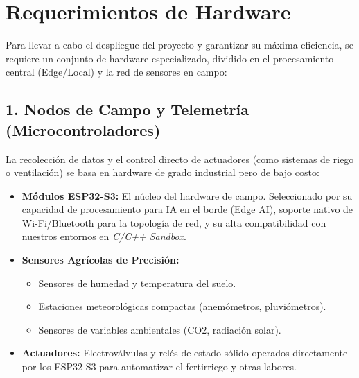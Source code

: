 \documentclass[12pt,a4paper]{article}
\begin{document}
\section{Requerimientos de Hardware}
Para llevar a cabo el despliegue del proyecto y garantizar su máxima eficiencia, se requiere un conjunto de hardware especializado, dividido en el procesamiento central (Edge/Local) y la red de sensores en campo:

\subsection{1. Nodos de Campo y Telemetría (Microcontroladores)}
La recolección de datos y el control directo de actuadores (como sistemas de riego o ventilación) se basa en hardware de grado industrial pero de bajo costo:
\begin{itemize}
    \item \textbf{Módulos ESP32-S3:} El núcleo del hardware de campo. Seleccionado por su capacidad de procesamiento para IA en el borde (Edge AI), soporte nativo de Wi-Fi/Bluetooth para la topología de red, y su alta compatibilidad con nuestros entornos en \textit{C/C++ Sandbox}.
    \item \textbf{Sensores Agrícolas de Precisión:} 
    \begin{itemize}
        \item Sensores de humedad y temperatura del suelo.
        \item Estaciones meteorológicas compactas (anemómetros, pluviómetros).
        \item Sensores de variables ambientales (CO2, radiación solar).
    \end{itemize}
    \item \textbf{Actuadores:} Electroválvulas y relés de estado sólido operados directamente por los ESP32-S3 para automatizar el fertirriego y otras labores.
\end{itemize}
\end{document}
